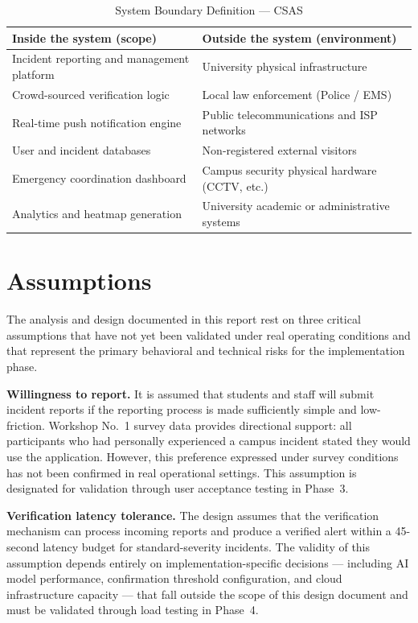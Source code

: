 \documentclass[12pt, oneside]{article}
\begin{document}
\begin{table}[H]
\caption{System Boundary Definition --- CSAS}
\label{tab:scope}
\renewcommand{\arraystretch}{1.2}
\centering
\begin{tabular}{L{6.5cm} L{6.5cm}}
\toprule
\textbf{Inside the system (scope)} & \textbf{Outside the system (environment)} \\
\midrule
Incident reporting and management platform & University physical infrastructure \\
Crowd-sourced verification logic & Local law enforcement (Police / EMS) \\
Real-time push notification engine & Public telecommunications and ISP networks \\
User and incident databases & Non-registered external visitors \\
Emergency coordination dashboard & Campus security physical hardware (CCTV, etc.) \\
Analytics and heatmap generation & University academic or administrative systems \\
\bottomrule
\end{tabular}
\end{table}

\section{Assumptions}

The analysis and design documented in this report rest on three critical assumptions
that have not yet been validated under real operating conditions and that represent the
primary behavioral and technical risks for the implementation phase.

\textbf{Willingness to report.} It is assumed that students and staff will submit
incident reports if the reporting process is made sufficiently simple and low-friction.
Workshop No.~1 survey data provides directional support: all participants who had
personally experienced a campus incident stated they would use the application.
However, this preference expressed under survey conditions has not been confirmed in
real operational settings. This assumption is designated for validation through user
acceptance testing in Phase~3.

\textbf{Verification latency tolerance.} The design assumes that the verification
mechanism can process incoming reports and produce a verified alert within a
45-second latency budget for standard-severity incidents. The validity of this
assumption depends entirely on implementation-specific decisions --- including AI
model performance, confirmation threshold configuration, and cloud infrastructure
capacity --- that fall outside the scope of this design document and must be validated
through load testing in Phase~4.
\end{document}
